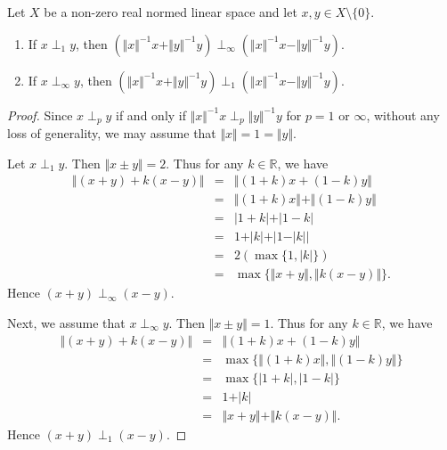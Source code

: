 \documentclass[10pt,a4paper]{amsart}
\begin{document}
\begin{lemma}\label{pd}
	Let $X$ be a non-zero real normed linear space and let $x, y \in X \setminus \lbrace 0 \rbrace$.
	\begin{enumerate}
		\item If $x \perp_1 y$, then $(\Vert x \Vert^{-1} x + \Vert y \Vert^{-1} y) \perp_{\infty} (\Vert x \Vert^{-1} x - \Vert y \Vert^{-1} y)$. 
		\item If $x \perp_{\infty} y$, then $(\Vert x \Vert^{-1} x + \Vert y \Vert^{-1} y) \perp_1 (\Vert x \Vert^{-1} x - \Vert y \Vert^{-1} y)$. 
	\end{enumerate}
\end{lemma} 

\begin{proof}
	Since $x \perp_p y$ if and only if $\Vert x \Vert^{-1} x \perp_p \Vert y \Vert^{-1} y$ for $p = 1$ or $\infty$, without any loss of generality, we may assume that $\Vert x \Vert = 1 = \Vert y \Vert$. 
	
	Let $x \perp_1 y$. Then $\Vert x \pm y \Vert = 2$. Thus for any $k \in \mathbb{R}$, we have 
	\begin{eqnarray*}
		\Vert (x + y) + k (x - y) \Vert &=& \Vert (1 + k) x + (1 - k) y \Vert \\
		&=& \Vert (1 + k) x \Vert + \Vert (1 - k) y \Vert \\ 
		&=& \vert 1 + k \vert + \vert 1 - k \vert \\ 
		&=& 1 + \vert k \vert + \vert 1 - \vert k \vert \vert \\ 
		&=& 2 \left( \max \lbrace 1, \vert k \vert \rbrace \right) \\ 
		&=& \max \lbrace \Vert x + y \Vert, \Vert k (x - y) \Vert \rbrace.
	\end{eqnarray*} 
	Hence $(x + y) \perp_{\infty} (x - y)$. 
	
	Next, we assume that $x \perp_{\infty} y$. Then $\Vert x \pm y \Vert = 1$. Thus for any $k \in \mathbb{R}$, we have 
	\begin{eqnarray*}
		\Vert (x + y) + k (x - y) \Vert &=& \Vert (1 + k) x + (1 - k) y \Vert \\
		&=& \max \lbrace \Vert (1 + k) x \Vert, \Vert (1 - k) y \Vert \rbrace \\ 
		&=& \max \lbrace \vert 1 + k \vert, \vert 1 - k \vert \rbrace \\ 
		&=& 1 + \vert k \vert \\ 
		&=& \Vert x + y \Vert + \Vert k (x - y) \Vert.
	\end{eqnarray*} 
	Hence $(x + y) \perp_1 (x - y)$. 
\end{proof} 
\end{document}
